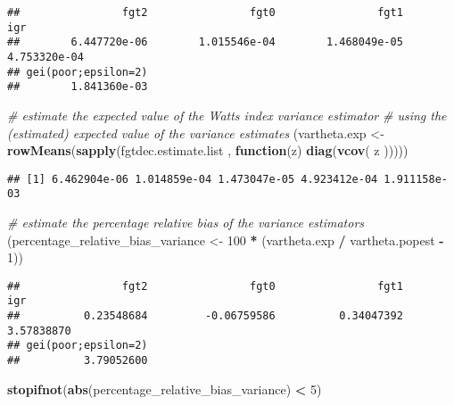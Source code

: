 \documentclass[
]{book}
\newenvironment{Shaded}{\begin{snugshade}}{\end{snugshade}}
\newcommand{\CommentTok}[1]{\textcolor[rgb]{0.56,0.35,0.01}{\textit{#1}}}
\newcommand{\ControlFlowTok}[1]{\textcolor[rgb]{0.13,0.29,0.53}{\textbf{#1}}}
\newcommand{\DecValTok}[1]{\textcolor[rgb]{0.00,0.00,0.81}{#1}}
\newcommand{\FunctionTok}[1]{\textcolor[rgb]{0.13,0.29,0.53}{\textbf{#1}}}
\newcommand{\NormalTok}[1]{#1}
\newcommand{\OtherTok}[1]{\textcolor[rgb]{0.56,0.35,0.01}{#1}}
\newcommand{\SpecialCharTok}[1]{\textcolor[rgb]{0.81,0.36,0.00}{\textbf{#1}}}
\begin{document}
\begin{verbatim}
##                fgt2                fgt0                fgt1                 igr 
##        6.447720e-06        1.015546e-04        1.468049e-05        4.753320e-04 
## gei(poor;epsilon=2) 
##        1.841360e-03
\end{verbatim}

\begin{Shaded}
\begin{Highlighting}[]
\CommentTok{\# estimate the expected value of the Watts index variance estimator}
\CommentTok{\# using the (estimated) expected value of the variance estimates}
\NormalTok{(vartheta.exp }\OtherTok{\textless{}{-}}
    \FunctionTok{rowMeans}\NormalTok{(}\FunctionTok{sapply}\NormalTok{(fgtdec.estimate.list , }\ControlFlowTok{function}\NormalTok{(z)}
      \FunctionTok{diag}\NormalTok{(}\FunctionTok{vcov}\NormalTok{(}
\NormalTok{        z}
\NormalTok{      )))))}
\end{Highlighting}
\end{Shaded}

\begin{verbatim}
## [1] 6.462904e-06 1.014859e-04 1.473047e-05 4.923412e-04 1.911158e-03
\end{verbatim}

\begin{Shaded}
\begin{Highlighting}[]
\CommentTok{\# estimate the percentage relative bias of the variance estimators}
\NormalTok{(percentage\_relative\_bias\_variance }\OtherTok{\textless{}{-}} \DecValTok{100} \SpecialCharTok{*}\NormalTok{  (vartheta.exp }\SpecialCharTok{/}\NormalTok{ vartheta.popest }\SpecialCharTok{{-}} \DecValTok{1}\NormalTok{))}
\end{Highlighting}
\end{Shaded}

\begin{verbatim}
##                fgt2                fgt0                fgt1                 igr 
##          0.23548684         -0.06759586          0.34047392          3.57838870 
## gei(poor;epsilon=2) 
##          3.79052600
\end{verbatim}

\begin{Shaded}
\begin{Highlighting}[]
\FunctionTok{stopifnot}\NormalTok{(}\FunctionTok{abs}\NormalTok{(percentage\_relative\_bias\_variance) }\SpecialCharTok{\textless{}} \DecValTok{5}\NormalTok{)}
\end{Highlighting}
\end{Shaded}
\end{document}
